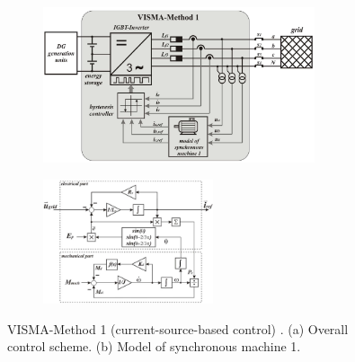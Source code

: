 \newpage
\begin{figure}[h!]
    \centering
    \begin{subfigure}[b]{\textwidth}
        \centering
        \includegraphics[width=8cm]{images/VISMA1Concept.png}
        \caption{}
        \label{fig:VISMA1Concept}
    \end{subfigure}

    \begin{subfigure}[b]{\textwidth}
        \centering
        \includegraphics[width=5cm]{images/VISMA1block.png}
        \caption{}
        \label{fig:VISMA1block}
    \end{subfigure}
    \label{fig:VISMA1}
    \caption{VISMA-Method 1 (current-source-based control) \cite{chen2012comparison}. (a) Overall control scheme. (b) Model of synchronous machine 1.}
\end{figure}


